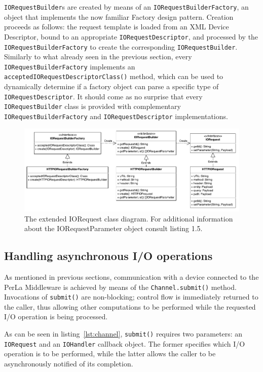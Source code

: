 \texttt{IORequestBuilder}s are created by means of an
\texttt{IORequestBuilderFactory}, an object that implements the now familiar
Factory design pattern. Creation proceeds as follows: the request template is
loaded from an XML Device Descriptor, bound to an appropriate
\texttt{IORequestDescriptor}, and processed by the
\texttt{IORequestBuilderFactory} to create the corresponding
\texttt{IORequestBuilder}. Similarly to what already seen in the previous
section, every \texttt{IORequestBuilderFactory} implements an
\texttt{acceptedIORequestDescriptorClass()} method, which can be used to
dynamically determine if a factory object can parse a specific type of
\texttt{IORequestDescriptor}. It should come as no surprise that every
\texttt{IORequestBuilder} class is provided with complementary
\texttt{IORequestBuilderFactory} and \texttt{IORequestDescriptor}
implementations.

\begin{figure}[!hbt]
\includegraphics[width=\textwidth]{imgs/iorequest.pdf}
\caption{The extended IORequest class diagram. For additional information about
the IORequestParameter object consult listing 1.5.} \label{fig:iorequest.class}
\end{figure}


\subsection{Handling asynchronous I/O operations}

As mentioned in previous sections, communication with a device connected to the
PerLa Middleware is achieved by means of the \texttt{Channel.submit()} method.
Invocations of \texttt{submit()} are non-blocking; control flow is immediately
returned to the caller, thus allowing other computations to be performed while
the requested I/O operation is being processed.

As can be seen in listing~\ref{lst:channel}, \texttt{submit()} requires two
parameters: an \texttt{IORequest} and an \texttt{IOHandler} callback object.
The former specifies which I/O operation is to be performed, while the latter
allows the caller to be asynchronously notified of its completion.

